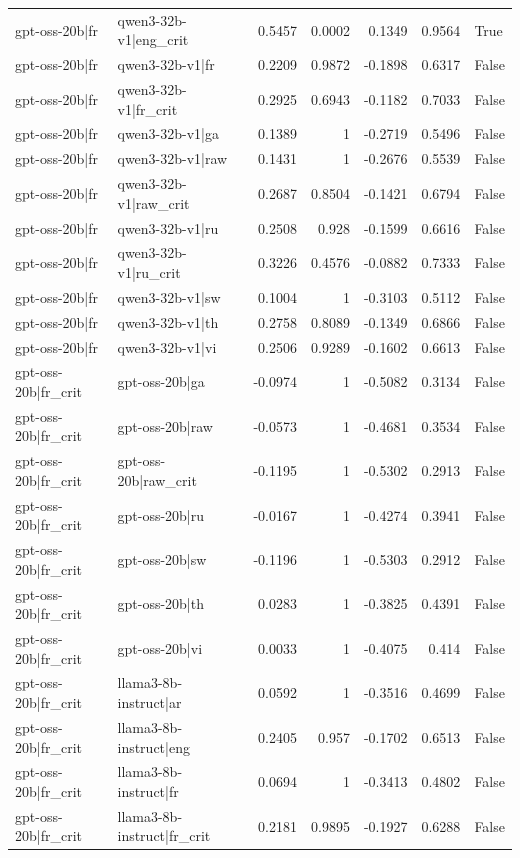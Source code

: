 \begin{table}
\begin{tabular}{l l r r r r l}
gpt-oss-20b|fr & qwen3-32b-v1|eng_crit & 0.5457 & 0.0002 & 0.1349 & 0.9564 & True \\
gpt-oss-20b|fr & qwen3-32b-v1|fr & 0.2209 & 0.9872 & -0.1898 & 0.6317 & False \\
gpt-oss-20b|fr & qwen3-32b-v1|fr_crit & 0.2925 & 0.6943 & -0.1182 & 0.7033 & False \\
gpt-oss-20b|fr & qwen3-32b-v1|ga & 0.1389 & 1 & -0.2719 & 0.5496 & False \\
gpt-oss-20b|fr & qwen3-32b-v1|raw & 0.1431 & 1 & -0.2676 & 0.5539 & False \\
gpt-oss-20b|fr & qwen3-32b-v1|raw_crit & 0.2687 & 0.8504 & -0.1421 & 0.6794 & False \\
gpt-oss-20b|fr & qwen3-32b-v1|ru & 0.2508 & 0.928 & -0.1599 & 0.6616 & False \\
gpt-oss-20b|fr & qwen3-32b-v1|ru_crit & 0.3226 & 0.4576 & -0.0882 & 0.7333 & False \\
gpt-oss-20b|fr & qwen3-32b-v1|sw & 0.1004 & 1 & -0.3103 & 0.5112 & False \\
gpt-oss-20b|fr & qwen3-32b-v1|th & 0.2758 & 0.8089 & -0.1349 & 0.6866 & False \\
gpt-oss-20b|fr & qwen3-32b-v1|vi & 0.2506 & 0.9289 & -0.1602 & 0.6613 & False \\
gpt-oss-20b|fr_crit & gpt-oss-20b|ga & -0.0974 & 1 & -0.5082 & 0.3134 & False \\
gpt-oss-20b|fr_crit & gpt-oss-20b|raw & -0.0573 & 1 & -0.4681 & 0.3534 & False \\
gpt-oss-20b|fr_crit & gpt-oss-20b|raw_crit & -0.1195 & 1 & -0.5302 & 0.2913 & False \\
gpt-oss-20b|fr_crit & gpt-oss-20b|ru & -0.0167 & 1 & -0.4274 & 0.3941 & False \\
gpt-oss-20b|fr_crit & gpt-oss-20b|sw & -0.1196 & 1 & -0.5303 & 0.2912 & False \\
gpt-oss-20b|fr_crit & gpt-oss-20b|th & 0.0283 & 1 & -0.3825 & 0.4391 & False \\
gpt-oss-20b|fr_crit & gpt-oss-20b|vi & 0.0033 & 1 & -0.4075 & 0.414 & False \\
gpt-oss-20b|fr_crit & llama3-8b-instruct|ar & 0.0592 & 1 & -0.3516 & 0.4699 & False \\
gpt-oss-20b|fr_crit & llama3-8b-instruct|eng & 0.2405 & 0.957 & -0.1702 & 0.6513 & False \\
gpt-oss-20b|fr_crit & llama3-8b-instruct|fr & 0.0694 & 1 & -0.3413 & 0.4802 & False \\
gpt-oss-20b|fr_crit & llama3-8b-instruct|fr_crit & 0.2181 & 0.9895 & -0.1927 & 0.6288 & False \\

\end{tabular}
\end{table}
